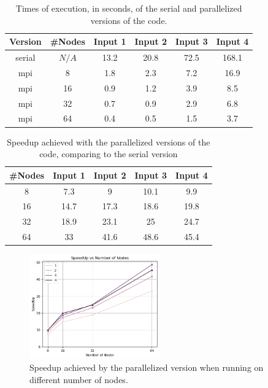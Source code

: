 \documentclass{article}
\begin{document}
\begin{table}[h!]
	\centering
	\begin{tabular}{||c c c c c c||} 
	 \hline
	 Version & \#Nodes & Input 1 & Input 2 & Input 3 & Input 4\\ [0.5ex] 
	 \hline\hline
	 serial & $N/A$ & 13.2 & 20.8 & 72.5 & 168.1 \\ 
	 mpi & 8 & 1.8 & 2.3 & 7.2 & 16.9 \\ 
	 mpi & 16 & 0.9 & 1.2 & 3.9 & 8.5  \\
	 mpi & 32 & 0.7 & 0.9 & 2.9 & 6.8 \\
	 mpi & 64 & 0.4 & 0.5 & 1.5 & 3.7 \\ [1ex] 
	 \hline
	\end{tabular}
	\caption{Times of execution, in seconds, of the serial and parallelized versions of the code.}
	\label{execution-times}
\end{table}

\begin{table}[h!]
	\centering
	\begin{tabular}{||c c c c c||} 
	 \hline
	 \#Nodes & Input 1 & Input 2 & Input 3 & Input 4\\ [0.5ex] 
	 \hline\hline
	 8 & 7.3 & 9 & 10.1 & 9.9 \\ 
	 16 & 14.7 & 17.3 & 18.6 & 19.8  \\
	 32 & 18.9 & 23.1 & 25 & 24.7 \\
	 64 & 33 & 41.6 & 48.6 & 45.4 \\ [1ex] 
	 \hline
	\end{tabular}
	\caption{Speedup achieved with the parallelized versions of the code, comparing to the serial version}
	\label{speedup}
\end{table}

\begin{figure}[htbp]
    \centering
    \includegraphics[width=0.5\textwidth]{img/speedup.png}
    \caption{Speedup achieved by the parallelized version when running on different number of nodes.}
    \label{speedup-graph}
\end{figure}
\end{document}
